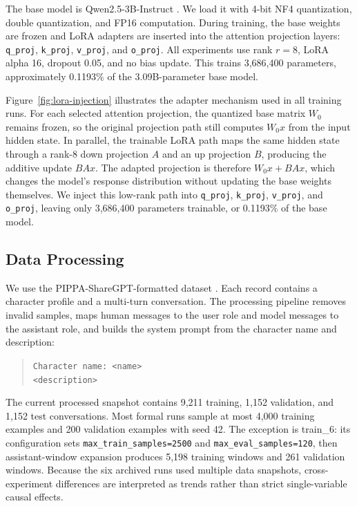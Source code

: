 \documentclass{article}
\begin{document}
The base model is Qwen2.5-3B-Instruct \citep{qwen2024qwen25}. We load it with
4-bit NF4 quantization, double quantization, and FP16 computation. During
training, the base weights are frozen and LoRA adapters are inserted into the
attention projection layers: \texttt{q\_proj}, \texttt{k\_proj},
\texttt{v\_proj}, and \texttt{o\_proj}. All experiments use rank $r=8$,
LoRA alpha 16, dropout 0.05, and no bias update. This trains 3,686,400
parameters, approximately 0.1193\% of the 3.09B-parameter base model.

\figLoraInjection

Figure~\ref{fig:lora-injection} illustrates the adapter mechanism used in all
training runs. For each selected attention projection, the quantized base
matrix $W_0$ remains frozen, so the original projection path still computes
$W_0x$ from the input hidden state. In parallel, the trainable LoRA path maps
the same hidden state through a rank-$8$ down projection $A$ and an up
projection $B$, producing the additive update $BAx$. The adapted projection is
therefore $W_0x + BAx$, which changes the model's response distribution without
updating the base weights themselves. We inject this low-rank path into
\texttt{q\_proj}, \texttt{k\_proj}, \texttt{v\_proj}, and \texttt{o\_proj},
leaving only 3,686,400 parameters trainable, or 0.1193\% of the base model.

\subsection{Data Processing}

We use the PIPPA-ShareGPT-formatted dataset
\citep{gosling2023pippa,karakarawitch2023pippa}. Each record contains a
character profile and a
multi-turn conversation. The processing pipeline removes invalid samples,
maps human messages to the user role and model messages to the assistant role,
and builds the system prompt from the character name and description:
\begin{quote}
  \texttt{Character name: <name>}\\
  \texttt{<description>}
\end{quote}
The current processed snapshot contains 9,211 training, 1,152 validation, and
1,152 test conversations. Most formal runs sample at most 4,000 training
examples and 200 validation examples with seed 42. The exception is train\_6:
its configuration sets \texttt{max\_train\_samples=2500} and
\texttt{max\_eval\_samples=120}, then assistant-window expansion produces
5,198 training windows and 261 validation windows. Because the six archived
runs used multiple data snapshots, cross-experiment differences are interpreted
as trends rather than strict single-variable causal effects.
\end{document}
